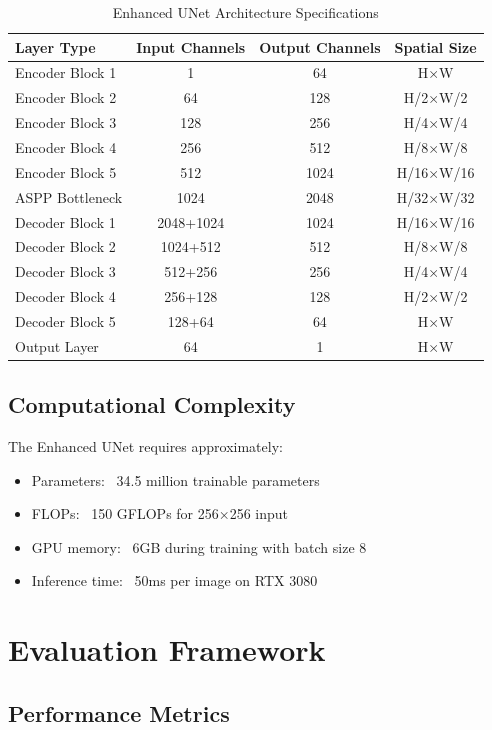 \begin{table}[h]
\centering
\caption{Enhanced UNet Architecture Specifications}
\begin{tabular}{|l|c|c|c|}
\hline
Layer Type & Input Channels & Output Channels & Spatial Size \\
\hline
Encoder Block 1 & 1 & 64 & H×W \\
Encoder Block 2 & 64 & 128 & H/2×W/2 \\
Encoder Block 3 & 128 & 256 & H/4×W/4 \\
Encoder Block 4 & 256 & 512 & H/8×W/8 \\
Encoder Block 5 & 512 & 1024 & H/16×W/16 \\
ASPP Bottleneck & 1024 & 2048 & H/32×W/32 \\
Decoder Block 1 & 2048+1024 & 1024 & H/16×W/16 \\
Decoder Block 2 & 1024+512 & 512 & H/8×W/8 \\
Decoder Block 3 & 512+256 & 256 & H/4×W/4 \\
Decoder Block 4 & 256+128 & 128 & H/2×W/2 \\
Decoder Block 5 & 128+64 & 64 & H×W \\
Output Layer & 64 & 1 & H×W \\
\hline
\end{tabular}
\end{table}

\subsection{Computational Complexity}

The Enhanced UNet requires approximately:
\begin{itemize}
\item Parameters: ~34.5 million trainable parameters
\item FLOPs: ~150 GFLOPs for 256×256 input
\item GPU memory: ~6GB during training with batch size 8
\item Inference time: ~50ms per image on RTX 3080
\end{itemize}

\section{Evaluation Framework}

\subsection{Performance Metrics}

